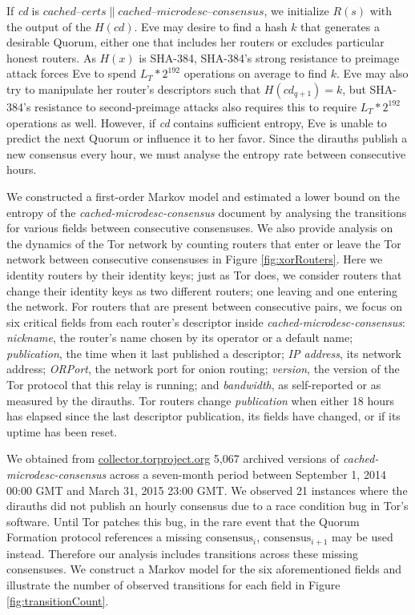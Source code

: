 \documentclass{sig-alternate}
\newcommand*\concat{\mathbin{\|}}
\begin{document}
If \emph{cd} is $ \mathit{cached \mbox{--} certs} \concat \mathit{cached \mbox{--} microdesc \mbox{--} consensus} $, we initialize $ \mathit{R}(s) $ with the output of the $ H(\mathit{cd}) $. Eve may desire to find a hash $ k $ that generates a desirable Quorum, either one that includes her routers or excludes particular honest routers. As $ H(x) $ is SHA-384, SHA-384's strong resistance to preimage attack forces Eve to spend $ L_{T} * 2^{192} $ operations on average to find $ k $. Eve may also try to manipulate her router's descriptors such that $ H(\mathit{cd}_{q+1}) = k $, but SHA-384's resistance to second-preimage attacks also requires this to require $ L_{T} * 2^{192} $ operations as well. However, if \emph{cd} contains sufficient entropy, Eve is unable to predict the next Quorum or influence it to her favor. Since the dirauths publish a new consensus every hour, we must analyse the entropy rate between consecutive hours.

We constructed a first-order Markov model and estimated a lower bound on the entropy of the \emph{cached-microdesc-consensus} document by analysing the transitions for various fields between consecutive consensuses. We also provide analysis on the dynamics of the Tor network by counting routers that enter or leave the Tor network between consecutive consensuses in Figure \ref{fig:xorRouters}. Here we identity routers by their identity keys; just as Tor does, we consider routers that change their identity keys as two different routers; one leaving and one entering the network. For routers that are present between consecutive pairs, we focus on six critical fields from each router's descriptor inside \emph{cached-microdesc-consensus}: \emph{nickname}, the router's name chosen by its operator or a default name; \emph{publication}, the time when it last published a descriptor; \emph{IP address}, its network address; \emph{ORPort}, the network port for onion routing; \emph{version}, the version of the Tor protocol that this relay is running; and \emph{bandwidth}, as self-reported or as measured by the dirauths. Tor routers change \emph{publication} when either 18 hours has elapsed since the last descriptor publication, its fields have changed, or if its uptime has been reset.

We obtained from \url{collector.torproject.org} 5,067 archived versions of \emph{cached-microdesc-consensus} across a seven-month period between September 1, 2014 00:00 GMT and March 31, 2015 23:00 GMT. We observed 21 instances where the dirauths did not publish an hourly consensus due to a race condition bug in Tor's software. Until Tor patches this bug, in the rare event that the Quorum Formation protocol references a missing $ \mathrm{consensus}_{i} $, $ \mathrm{consensus}_{i + 1} $ may be used instead. Therefore our analysis includes transitions across these missing consensuses. We construct a Markov model for the six aforementioned fields and illustrate the number of observed transitions for each field in Figure \ref{fig:transitionCount}.
\end{document}
